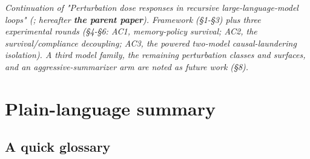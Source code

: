 \documentclass{article}
\theoremstyle{plain}
\theoremstyle{definition}
\begin{document}
\textit{Continuation of "Perturbation dose responses in recursive large-language-model loops" (\citet{arxiv260502236}; hereafter \textbf{the parent paper}). Framework (§1-§3) plus three experimental rounds (§4-§6: AC1, memory-policy survival; AC2, the survival/compliance decoupling; AC3, the powered two-model causal-laundering isolation). A third model family, the remaining perturbation classes and surfaces, and an aggressive-summarizer arm are noted as future work (§8).}


\section*{Plain-language summary}

\subsection*{A quick glossary}
\end{document}

